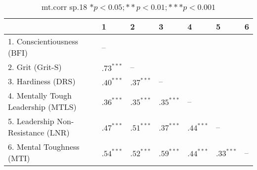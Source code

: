 \begin{table}[ht]
\centering
\begin{tabular}{lllllll}
  \hline
 & 1 & 2 & 3 & 4 & 5 & 6 \\ 
  \hline
1. Conscientiousness (BFI) & -- &  &  &  &  &  \\ 
  2. Grit (Grit-S) & $.73^{***}$ & -- &  &  &  &  \\ 
  3. Hardiness (DRS) & $.40^{***}$ & $.37^{***}$ & -- &  &  &  \\ 
  4. Mentally Tough Leadership (MTLS) & $.36^{***}$ & $.35^{***}$ & $.35^{***}$ & -- &  &  \\ 
  5. Leadership Non-Resistance (LNR) & $.47^{***}$ & $.51^{***}$ & $.37^{***}$ & $.44^{***}$ & -- &  \\ 
  6. Mental Toughness (MTI) & $.54^{***}$ & $.52^{***}$ & $.59^{***}$ & $.44^{***}$ & $.33^{***}$ & -- \\ 
   \hline
\end{tabular}
\caption{mt.corr sp.18 $* p < 0.05; ** p < 0.01; *** p < 0.001$} 
\label{freq_corr.mt.corr.sp.18}
\end{table}

